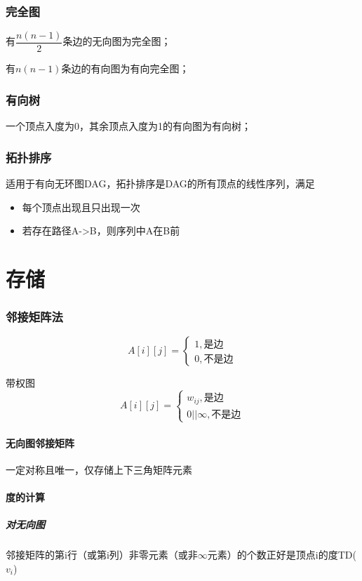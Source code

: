 \subsubsection{完全图}

有\(\dfrac{n(n - 1)}{2}\)条边的无向图为完全图；

有\(n(n - 1)\)条边的有向图为有向完全图；


\subsubsection{有向树}
一个顶点入度为0，其余顶点入度为1的有向图为有向树；


\subsubsection{拓扑排序}
适用于有向无环图DAG，拓扑排序是DAG的所有顶点的线性序列，满足
\begin{itemize}
    \item 每个顶点出现且只出现一次
    \item 若存在路径A->B，则序列中A在B前
\end{itemize}



\section{存储}

\subsubsection{邻接矩阵法}

\[A[i][j] = \begin{cases}
    1, \text{是边} \\ 
    0, \text{不是边}
\end{cases}\]

带权图\[A[i][j] = \begin{cases}
    w_{ij}, \text{是边} \\ 
    0 || \infty, \text{不是边}
\end{cases}\]

\paragraph{无向图邻接矩阵}
一定对称且唯一，仅存储上下三角矩阵元素

\paragraph{度的计算}
\subparagraph{对无向图}
邻接矩阵的第i行（或第i列）非零元素（或非\(\infty\)元素）的个数正好是顶点i的度TD(\(v_i\))


